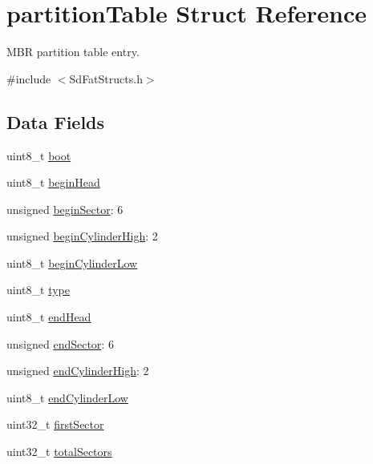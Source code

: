 \hypertarget{structpartition_table}{\section{partition\-Table Struct Reference}
\label{structpartition_table}
}


M\-B\-R partition table entry.  




{\ttfamily \#include $<$Sd\-Fat\-Structs.\-h$>$}

\subsection*{Data Fields}
\begin{DoxyCompactItemize}
\item 
uint8\-\_\-t \hyperlink{structpartition_table_ad2acb7fab9ef33a6f00c834401250229}{boot}
\item 
uint8\-\_\-t \hyperlink{structpartition_table_ab27b713d70d01c43e31fc67e08f876bf}{begin\-Head}
\item 
unsigned \hyperlink{structpartition_table_a3ef026d5e8a9c697e414cf773b129db4}{begin\-Sector}\-: 6
\item 
unsigned \hyperlink{structpartition_table_aae20759e6c6dbfa51368964f8fe095c7}{begin\-Cylinder\-High}\-: 2
\item 
uint8\-\_\-t \hyperlink{structpartition_table_afefdee23280567f8434f9c31610e0a3b}{begin\-Cylinder\-Low}
\item 
uint8\-\_\-t \hyperlink{structpartition_table_a1d127017fb298b889f4ba24752d08b8e}{type}
\item 
uint8\-\_\-t \hyperlink{structpartition_table_a248e6a8c42872744129b8b85a864a7a6}{end\-Head}
\item 
unsigned \hyperlink{structpartition_table_a1412f3c5116885eb7d4a047e432c9cdd}{end\-Sector}\-: 6
\item 
unsigned \hyperlink{structpartition_table_adeccbdcad0d989d1e33a07b435ab7300}{end\-Cylinder\-High}\-: 2
\item 
uint8\-\_\-t \hyperlink{structpartition_table_a3eb4b87675075500899edbb9296e0435}{end\-Cylinder\-Low}
\item 
uint32\-\_\-t \hyperlink{structpartition_table_a5951cd74127d45180071909972899c0e}{first\-Sector}
\item 
uint32\-\_\-t \hyperlink{structpartition_table_ab3559f69d4a46a945bd4c037070585f2}{total\-Sectors}
\end{DoxyCompactItemize}


